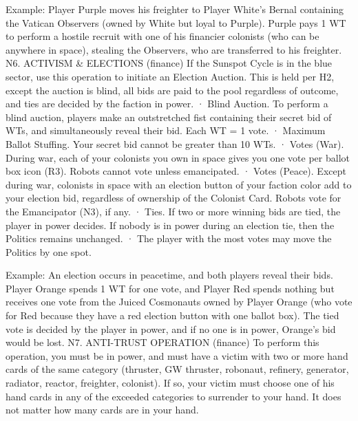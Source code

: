 \documentclass[a4paper]{book}
\begin{document}
Example: Player Purple moves his freighter to Player White’s Bernal containing the Vatican Observers (owned by White but loyal to Purple). Purple pays 1 WT to perform a hostile recruit with one of his financier colonists (who can be anywhere in space), stealing the Observers, who are transferred to his freighter.
N6. ACTIVISM \& ELECTIONS (finance)
If the Sunspot Cycle is in the blue sector, use this operation to initiate an Election Auction. This is held per H2, except the auction is blind, all bids are paid to the pool regardless of outcome, and ties are decided by the faction in power.
·       Blind Auction. To perform a blind auction, players make an outstretched fist containing their secret bid of WTs, and simultaneously reveal their bid. Each WT = 1 vote.
·       Maximum Ballot Stuffing. Your secret bid cannot be greater than 10 WTs.
·       Votes (War). During war, each of your colonists you own in space gives you one vote per ballot box icon (R3). Robots cannot vote unless emancipated.
·       Votes (Peace). Except during war, colonists in space with an election button of your faction color add to your election bid, regardless of ownership of the Colonist Card. Robots vote for the Emancipator (N3), if any.
·       Ties. If two or more winning bids are tied, the player in power decides. If nobody is in power during an election tie, then the Politics remains unchanged.
·       The player with the most votes may move the Politics by one spot.

Example: An election occurs in peacetime, and both players reveal their bids. Player Orange spends 1 WT for one vote, and Player Red spends nothing but receives one vote from the Juiced Cosmonauts owned by Player Orange (who vote for Red because they have a red election button with one ballot box). The tied vote is decided by the player in power, and if no one is in power, Orange's bid would be lost.
N7. ANTI-TRUST OPERATION (finance)
To perform this operation, you must be in power, and must have a victim with two or more hand cards of the same category (thruster, GW thruster, robonaut, refinery, generator, radiator, reactor, freighter, colonist). If so, your victim must choose one of his hand cards in any of the exceeded categories to surrender to your hand. It does not matter how many cards are in your hand.
\end{document}
